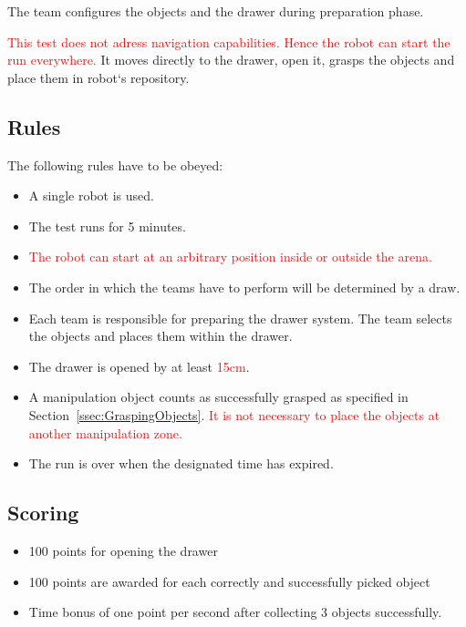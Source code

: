 The team configures the objects and the drawer during preparation phase.

\textcolor{red}{This test does not adress navigation capabilities. Hence the robot can start the run everywhere.} It moves directly to the drawer, open it, grasps the objects and place them in robot`s repository.

\subsection{Rules}
The following rules have to be obeyed:

\begin{itemize}
\item A single robot is used.
\item The test runs for 5 minutes.
\item \textcolor{red}{The robot can start at an arbitrary position inside or outside the arena.}
\item The order in which the teams have to perform will be determined by a draw.
\item Each team is responsible for preparing the drawer system. The team selects the objects and places them within the drawer.
\item The drawer is opened by at least \textcolor{red}{15cm}.
\item A manipulation object counts as successfully grasped as specified in Section~\ref{ssec:GraspingObjects}. \textcolor{red}{It is not necessary to place the objects at another manipulation zone.}
\item The run is over when the designated time has expired.
\end{itemize}

\subsection{Scoring}
\begin{itemize}
\item 100 points for opening the drawer
\item 100 points are awarded for each correctly and successfully picked object
\item Time bonus of one point per second after collecting 3 objects successfully.
\end{itemize}
